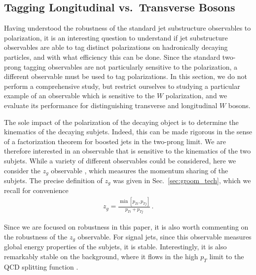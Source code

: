 \documentclass[11pt,letterpaper]{article}
\DeclareRobustCommand{\Sec}[1]{Sec.~\ref{#1}}
\begin{document}
\subsection{Tagging Longitudinal vs.\ Transverse Bosons}\label{sec:polar_tag}

Having understood the robustness of the standard jet substructure observables to polarization, it is an interesting question to understand if jet substructure observables are able to tag distinct polarizations on hadronically decaying particles, and with what efficiency this can be done.
%
Since the standard two-prong tagging observables are not particularly sensitive to the polarization, a different observable must be used to tag polarizations.
%
In this section, we do not perform a comprehensive study, but restrict ourselves to studying a particular example of an observable which is sensitive to the $W$ polarization, and we evaluate its performance for distinguishing transverse and longitudinal $W$ bosons. 

The sole impact of the polarization of the decaying object is to determine the kinematics of the decaying subjets.
%
Indeed, this can be made rigorous in the sense of a factorization theorem for boosted jets in the two-prong limit.
%
We are therefore interested in an observable that is sensitive to the kinematics of the two subjets.
%
While a variety of different observables could be considered, here we consider the $z_g$ observable \cite{Larkoski:2014wba,Larkoski:2014bia,Larkoski:2015lea}, which measures the momentum sharing of the subjets. The precise definition of $z_g$ was given in \Sec{sec:groom_tech}, which we recall for convenience
\begin{align}
z_g=\frac{\min\left[ p_{Ti}, p_{Tj}  \right]}{p_{Ti}+p_{Tj}}\,.
\end{align}

Since we are focused on robustness in this paper, it is also worth commenting on the robustness of the $z_g$ observable. For signal jets, since this observable measures global energy properties of the subjets, it is stable.
%
Interestingly, it is also remarkably stable on the background, where it flows in the high $p_T$ limit to the QCD splitting function \cite{Larkoski:2014wba,Larkoski:2014bia,Larkoski:2015lea}.
\end{document}
